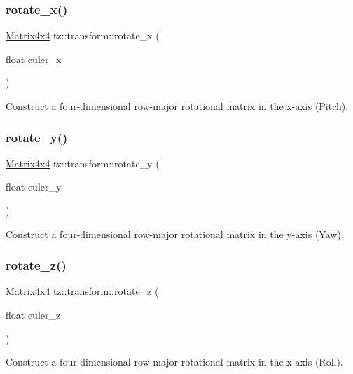 \subsubsection{\texorpdfstring{rotate\+\_\+x()}{rotate\_x()}}
{\footnotesize\ttfamily \mbox{\hyperlink{class_matrix4x4}{Matrix4x4}} tz\+::transform\+::rotate\+\_\+x (\begin{DoxyParamCaption}\item[{float}]{euler\+\_\+x }\end{DoxyParamCaption})}

Construct a four-\/dimensional row-\/major rotational matrix in the x-\/axis (Pitch). \mbox{\label{namespacetz_1_1transform_ad4f8e1471ddc14c62c3247f4335780a5}} 
\subsubsection{\texorpdfstring{rotate\+\_\+y()}{rotate\_y()}}
{\footnotesize\ttfamily \mbox{\hyperlink{class_matrix4x4}{Matrix4x4}} tz\+::transform\+::rotate\+\_\+y (\begin{DoxyParamCaption}\item[{float}]{euler\+\_\+y }\end{DoxyParamCaption})}

Construct a four-\/dimensional row-\/major rotational matrix in the y-\/axis (Yaw). \mbox{\label{namespacetz_1_1transform_a1fc9b0958f30aba9c97d55bc25fde583}} 
\subsubsection{\texorpdfstring{rotate\+\_\+z()}{rotate\_z()}}
{\footnotesize\ttfamily \mbox{\hyperlink{class_matrix4x4}{Matrix4x4}} tz\+::transform\+::rotate\+\_\+z (\begin{DoxyParamCaption}\item[{float}]{euler\+\_\+z }\end{DoxyParamCaption})}

Construct a four-\/dimensional row-\/major rotational matrix in the x-\/axis (Roll). \mbox{\label{namespacetz_1_1transform_a662bede6ecd13fd3555d612a06c350cf}} 
